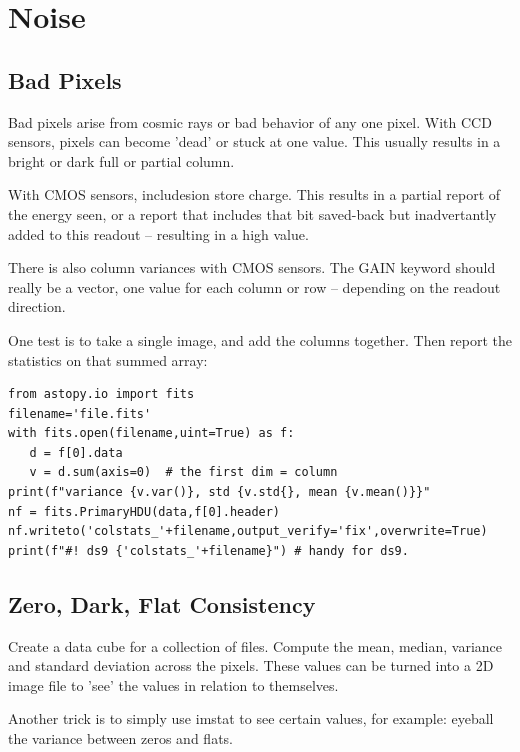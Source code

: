 \section{Noise}  \label{sec:noise}


\subsection{Bad Pixels}

Bad pixels arise from cosmic rays or bad behavior of any one pixel. With CCD sensors,
pixels can become 'dead' or stuck at one value. This usually results in a bright or
dark full or partial column.

With CMOS sensors, includesion store charge. This results in a partial report
of the energy seen, or a report that includes that bit saved-back but inadvertantly
added to this readout -- resulting in a high value.

There is also column variances with CMOS sensors. The GAIN keyword should
really be a vector, one value for each column or row -- depending on the
readout direction.

One test is to take a single image, and add the columns together. Then report
the statistics on that summed array:

\begingroup \fontsize{10pt}{10pt}
\selectfont
\begin{verbatim} 
from astopy.io import fits
filename='file.fits'
with fits.open(filename,uint=True) as f:
   d = f[0].data
   v = d.sum(axis=0)  # the first dim = column 
print(f"variance {v.var()}, std {v.std{}, mean {v.mean()}}"
nf = fits.PrimaryHDU(data,f[0].header)
nf.writeto('colstats_'+filename,output_verify='fix',overwrite=True)
print(f"#! ds9 {'colstats_'+filename}") # handy for ds9.
\end{verbatim}
\endgroup


\subsection{Zero, Dark, Flat Consistency}

Create a data cube for a collection of files. Compute the mean, median, variance and
standard deviation across the pixels. These values can be turned into a 2D image
file to 'see' the values in relation to themselves. 

Another trick is to simply use imstat to see certain values, for example: eyeball
the variance between zeros and flats.

